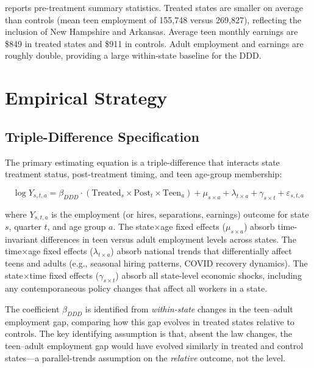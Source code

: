 \documentclass[12pt]{article}
\begin{document}


 reports pre-treatment summary statistics. Treated states are smaller on average than controls (mean teen employment of 155,748 versus 269,827), reflecting the inclusion of New Hampshire and Arkansas. Average teen monthly earnings are \$849 in treated states and \$911 in controls. Adult employment and earnings are roughly double, providing a large within-state baseline for the DDD.


\section{Empirical Strategy}
\label{sec:strategy}

\subsection{Triple-Difference Specification}

The primary estimating equation is a triple-difference that interacts state treatment status, post-treatment timing, and teen age-group membership:

\begin{equation}
\log Y_{s,t,a} = \beta_{DDD} \cdot (\text{Treated}_s \times \text{Post}_t \times \text{Teen}_a) + \mu_{s \times a} + \lambda_{t \times a} + \gamma_{s \times t} + \varepsilon_{s,t,a}
\label{eq:ddd}
\end{equation}

\noindent where $Y_{s,t,a}$ is the employment (or hires, separations, earnings) outcome for state $s$, quarter $t$, and age group $a$. The state$\times$age fixed effects ($\mu_{s \times a}$) absorb time-invariant differences in teen versus adult employment levels across states. The time$\times$age fixed effects ($\lambda_{t \times a}$) absorb national trends that differentially affect teens and adults (e.g., seasonal hiring patterns, COVID recovery dynamics). The state$\times$time fixed effects ($\gamma_{s \times t}$) absorb all state-level economic shocks, including any contemporaneous policy changes that affect all workers in a state.

The coefficient $\beta_{DDD}$ is identified from \textit{within-state} changes in the teen--adult employment gap, comparing how this gap evolves in treated states relative to controls. The key identifying assumption is that, absent the law changes, the teen--adult employment gap would have evolved similarly in treated and control states---a parallel-trends assumption on the \textit{relative} outcome, not the level.
\end{document}
